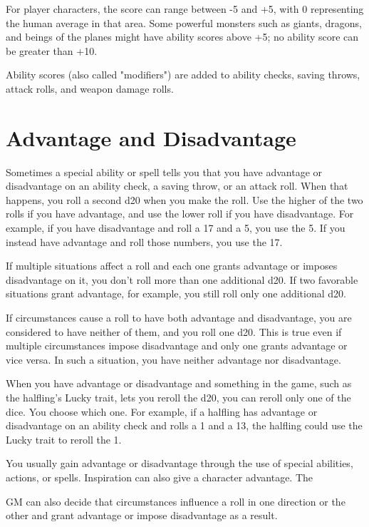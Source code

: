 For player characters, the score can range between -5 and +5, with 0 representing the human average in that area. Some powerful monsters such as giants, dragons, and beings of the planes might have ability scores above +5; no ability score can be greater than +10.

Ability scores (also called "modifiers") are added to ability checks, saving throws, attack rolls, and weapon damage rolls.

\section{Advantage and Disadvantage}

Sometimes a special ability or spell tells you that you have advantage or disadvantage on an ability check, a saving throw, or an attack roll. When that happens, you roll a second d20 when you make the roll. Use the higher of the two rolls if you have advantage, and use the lower roll if you have disadvantage. For example, if you have disadvantage and roll a 17 and a 5, you use the 5. If you instead have advantage and roll those numbers, you use the 17.

If multiple situations affect a roll and each one grants advantage or imposes disadvantage on it, you don't roll more than one additional d20. If two favorable situations grant advantage, for example, you still roll only one additional d20.

If circumstances cause a roll to have both advantage and disadvantage, you are considered to have neither of them, and you roll one d20. This is true even if multiple circumstances impose disadvantage and only one grants advantage or vice versa. In such a situation, you have neither advantage nor disadvantage.

When you have advantage or disadvantage and something in the game, such as the halfling's Lucky trait, lets you reroll the d20, you can reroll only one of the dice. You choose which one. For example, if a halfling has advantage or disadvantage on an ability check and rolls a 1 and a 13, the halfling could use the Lucky trait to reroll the 1.

You usually gain advantage or disadvantage through the use of special abilities, actions, or spells. Inspiration can also give a character advantage. The

GM can also decide that circumstances influence a roll in one direction or the other and grant advantage or impose disadvantage as a result.

